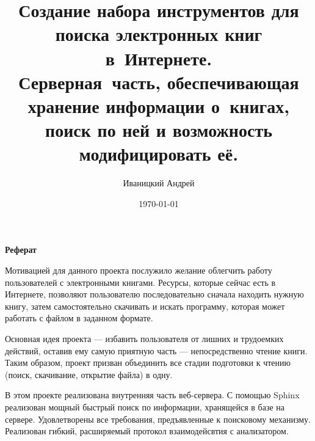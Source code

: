 \documentclass[a4paper,12pt]{article}
\begin{document}
\title{Создание набора инструментов для поиска электронных книг в~Интернете.\\
Серверная~часть, 
обеспечивающая хранение информации о~книгах, поиск по ней и возможность модифицировать её.}
\author{Иваницкий Андрей}
\date{\today}
\maketitle

\newpage


\begin{center}
\textbf{Реферат}
\end{center}

Мотивацией для данного проекта послужило желание облегчить работу пользователей с электронными книгами. Ресурсы, которые сейчас есть в Интернете, позволяют пользователю последовательно сначала находить нужную книгу, затем самостоятельно скачивать и искать программу, которая может работать с файлом в заданном формате.

Основная идея проекта --- избавить пользователя от лишних и трудоемких действий, оставив ему самую приятную часть --- непосредственно чтение книги. Таким образом, проект призван объединить все стадии подготовки к чтению (поиск, скачивание, открытие файла) в одну.

В этом проекте реализована внутренняя часть веб-сервера.
С помощью Sphinx реализован мощный быстрый поиск по информации, хранящейся в базе на сервере.
Удовлетворены все требования, предъявленные к поисковому механизму.
Реализован гибкий, расширяемый протокол взаимодейсвтия с анализатором.


\newpage
\tableofcontents
\newpage


%

%

%

%

%



\end{document}
